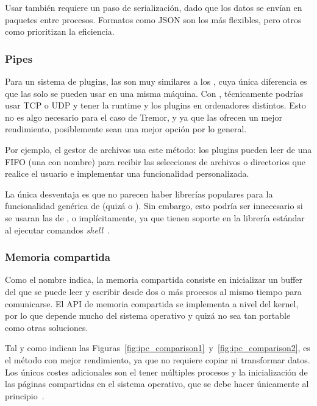 Usar \sockets también requiere un paso de serialización, dado que los datos se
envían en paquetes entre procesos. Formatos como JSON son los más flexibles,
pero otros como  prioritizan la eficiencia.

\subsubsection{Pipes}

Para un sistema de plugins, las \pipes son muy similares a los \sockets, cuya
única diferencia es que las \pipes solo se pueden usar en una misma máquina. Con
\sockets, técnicamente podrías usar TCP o UDP y tener la runtime y los plugins
en ordenadores distintos. Esto no es algo necesario para el caso de Tremor, y ya
que las \pipes ofrecen un mejor rendimiento, posiblemente sean una mejor opción
por lo general.

Por ejemplo, el gestor de archivos  usa este método: los plugins
pueden leer de una FIFO (una \pipe con nombre) para recibir las selecciones de
archivos o directorios que realice el usuario e implementar una funcionalidad
personalizada.

La única desventaja es que no parecen haber librerías populares para la
funcionalidad genérica de \pipes (quizá  o
). Sin embargo, esto podría ser innecesario si se usaran las
\pipes de \stdin, \stdout o \stderr implícitamente, ya que tienen soporte en la
librería estándar al ejecutar comandos \emph{shell}~\cite[Pipes]{rustexample}.

\subsubsection{Memoria compartida}

Como el nombre indica, la memoria compartida consiste en inicializar un buffer
del que se puede leer y escribir desde dos o más procesos al mismo tiempo para
comunicarse. El API de memoria compartida se implementa a nivel del kernel, por
lo que depende mucho del sistema operativo y quizá no sea tan portable como
otras soluciones.

Tal y como indican las
Figuras~\ref{fig:ipc_comparison1}~y~\ref{fig:ipc_comparison2}, es el método con
mejor rendimiento, ya que no requiere copiar ni transformar datos. Los únicos
costes adicionales son el tener múltiples procesos y la inicialización de las
páginas compartidas en el sistema operativo, que se debe hacer únicamente al
principio~\cite{sharedmemperf}.

